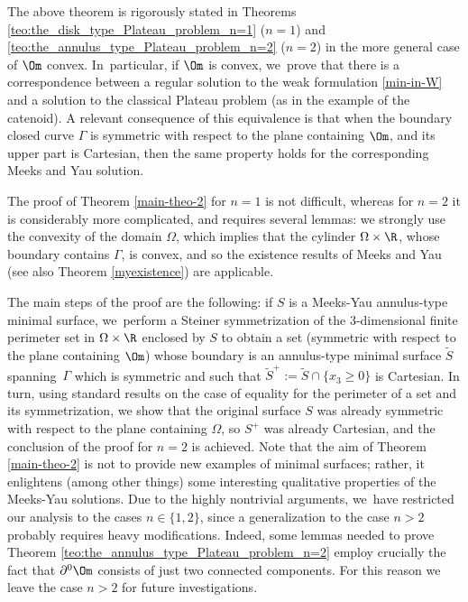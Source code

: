 The above theorem is rigorously stated in Theorems \ref{teo:the_disk_type_Plateau_problem_n=1} ($n=1$) and \ref{teo:the_annulus_type_Plateau_problem_n=2} ($n=2$) in the more general case of $\Om$ convex. In~particular, if $\Om$ is convex, we~prove that there is a correspondence between a regular solution to the weak formulation \eqref{min-in-W} and a solution to the classical Plateau problem (as in the example of the catenoid).
A relevant consequence of this equivalence is
that when the boundary closed curve $\Gamma$ is symmetric with respect to the plane containing $\Om$, and its
upper part
is Cartesian, then the same property holds for the corresponding
Meeks and Yau solution.

The proof of Theorem \ref{main-theo-2} for $n=1$ is not difficult,
whereas for $n=2$ it is considerably more complicated,
and requires several lemmas:
we strongly use the convexity of the domain $\Omega$,
which implies that the cylinder $\Omega\times \R$, whose boundary contains $\Gamma$, is convex, and so the existence results of Meeks and Yau \cite{MY} (see also Theorem \ref{myexistence}) are applicable.

The main steps of the proof are the following: if $S$ is a Meeks-Yau annulus-type minimal surface, we~perform a Steiner symmetrization of the $3$-dimensional finite perimeter set in $\Omega\times\R$ enclosed by $S$ to obtain a set (symmetric with respect to the plane containing $\Om$) whose boundary is an annulus-type minimal surface $\widetilde S$ spanning~$\Gamma$ which is symmetric and such that $\widetilde S^+:=\widetilde S\cap\{x_3\ge0\}$ is Cartesian.
In turn, using standard results on the case
of equality for the perimeter of a set and its symmetrization, we
show that the original surface $S$
was already symmetric with respect to the plane containing $\Omega$, so $S^+$ was already Cartesian, and the conclusion of the proof for $n=2$ is achieved. Note that the aim of Theorem \ref{main-theo-2}
is not to provide new examples of minimal surfaces; rather, it enlightens
(among other things) some interesting qualitative properties of the Meeks-Yau
solutions.
Due to the highly nontrivial arguments, we~have restricted our analysis to the cases $n\in\{1,2\}$, since a generalization to the case $n>2$ probably requires heavy modifications.
Indeed, some lemmas needed to prove Theorem \ref{teo:the_annulus_type_Plateau_problem_n=2} employ crucially the fact that $\partial^0\Om$ consists of just two connected components.
For this reason we leave the case $n>2$ for future investigations.

